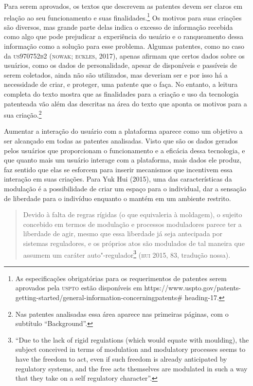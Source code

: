 \noindent{}Para serem aprovados, os textos que descrevem as patentes devem ser
claros em relação ao seu funcionamento e suas finalidades.\footnote{As
  especificações obrigatórias para os requerimentos de patentes serem
  aprovados pela \textsc{uspto}
  estão disponíveis em
  https://www.uspto.gov/patents-getting-started/general-information-concerningpatents\#
  heading-17.} Os motivos para suas criações são diversos, mas grande
parte delas indica o excesso de informação recebida como algo que pode
prejudicar a experiência do usuário e o ranqueamento dessa informação
como a solução para esse problema. Algumas patentes, como no caso da
\textsc{us970752b2} (\textsc{nowak}; \textsc{eckles}, 2017), apenas afirmam que certos dados sobre
os usuários, como os dados de personalidade, apesar de disponíveis e
passíveis de serem coletados, ainda não são utilizados, mas deveriam ser
e por isso há a necessidade de criar, e proteger, uma patente que o
faça. No entanto, a leitura completa do texto mostra que as finalidades
para a criação e uso da tecnologia patenteada vão além das descritas na
área do texto que aponta os motivos para a sua criação.\footnote{Nas
  patentes analisadas essa área aparece nas primeiras páginas, com o
  subtítulo ``Background''.}

Aumentar a interação do usuário com a plataforma aparece como um
objetivo a ser alcançado em todas as patentes analisadas. Visto que são
os dados gerados pelos usuários que proporcionam o funcionamento e a
eficácia dessa tecnologia, e que quanto mais um usuário interage com a
plataforma, mais dados ele produz, faz sentido que elas se esforcem para
inserir mecanismos que incentivem essa interação em suas criações. Para
Yuk Hui (2015), uma das características da modulação é a possibilidade
de criar um espaço para o individual, dar a sensação de liberdade para o
indivíduo enquanto o mantém em um ambiente restrito.

\begin{quote}
Devido à falta de regras rígidas (o que equivaleria à moldagem), o
sujeito concebido em termos de modulação e processos moduladores parece
ter a liberdade de agir, mesmo que essa liberdade já seja antecipada por
sistemas reguladores, e os próprios atos são modulados de tal maneira
que assumem um caráter auto"-regulador\footnote{``Due to the lack of
  rigid regulations (which would equate with moulding), the subject
  conceived in terms of modulation and modulatory processes seems to
  have the freedom to act, even if such freedom is already anticipated
  by regulatory systems, and the free acts themselves are modulated in
  such a way that they take on a self regulatory character''.} (\textsc{hui}
2015, 83, tradução nossa).
\end{quote}

